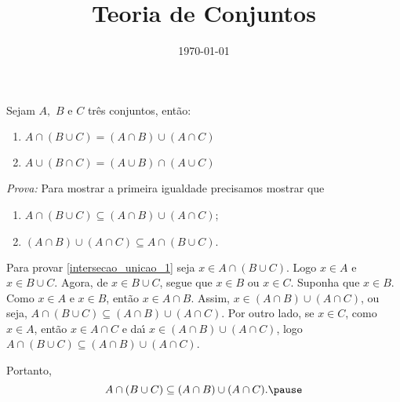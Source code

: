 \documentclass{beamer}
\title{Teoria de Conjuntos}
\author[\autor]{\autor}
\institute[\instituto]{\instituto}
\date{\today}
\begin{document}
    \begin{frame}
        \maketitle
    \end{frame}


    \begin{frame}
        \begin{proposicao} Sejam $A,$ $B$ e $C$ tr{\^e}s conjuntos, ent{\~a}o:\pause
            \begin{enumerate}[label={\roman*})]
                \item $A \cap ( B \cup C) = (A \cap B) \cup (A \cap C)$\pause
                \item $A \cup (B \cap C) = (A \cup B) \cap (A \cup C)$\pause
            \end{enumerate}
        \end{proposicao}
        \textit{Prova:} \pause
        Para mostrar a primeira igualdade precisamos mostrar que\pause
        \begin{enumerate}[label=({\arabic*})]
            \item $A \cap (B \cup C) \subseteq (A \cap B) \cup ( A \cap C)$;\label{intersecao_unicao_1}\pause
            \item $(A \cap B) \cup (A \cap C) \subseteq A \cap (B \cup C).$\label{intersecao_unicao_2}\pause
        \end{enumerate}

        Para provar \ref{intersecao_unicao_1} seja $x\in A \cap (B \cup C)$. \pause Logo $x \in A$ \pause e $x \in B \cup C$. \pause Agora, de $x \in B \cup C$, \pause segue que $x \in B$ \pause ou $x \in C$. \pause Suponha que $x \in B$. \pause Como $x \in A$ e $x \in B$, \pause ent\~ao $x \in A \cap B$. \pause Assim, $x \in (A \cap B) \cup (A \cap C)$, \pause ou seja, $A \cap (B \cup C) \subseteq (A \cap B) \cup (A \cap C)$. \pause Por outro lado, se $x \in C$, \pause como $x \in A$, ent{\~a}o $x \in A \cap C$ \pause e da{\'\i} $x \in (A \cap B) \cup (A \cap C)$, \pause logo $A \cap (B \cup C)\subseteq (A \cap B) \cup (A \cap C)$.\pause

        Portanto,
        \[
            A \cap (B \cup C) \subseteq (A \cap B) \cup (A \cap C).\pause
        \]
    \end{frame}
\end{document}
